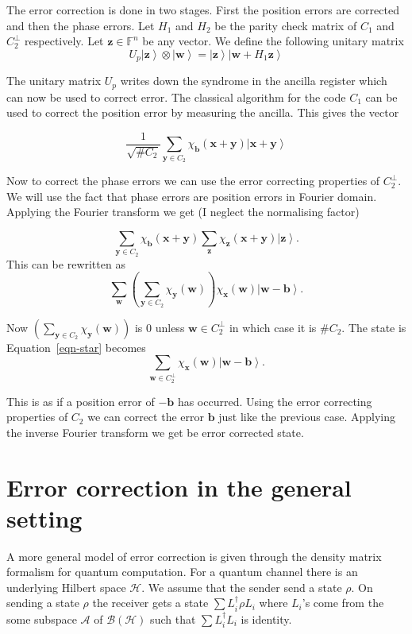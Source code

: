 \documentclass[11pt,twoside]{article}
\theoremstyle{definition}
\theoremstyle{remark}
\newcommand{\ket}[1]{\ensuremath{\left\vert #1 \right\rangle}}
\newcommand{\Oper}[1]{\ensuremath{\mathcal{B}\left(#1\right)}}
\begin{document}
The error correction is done in two stages. First the position errors
are corrected and then the phase errors. Let $H_1$ and $H_2$ be the
parity check matrix of $C_1$ and $C_2^\perp$ respectively. Let
$\mathbf{z} \in \mathbb{F}^n$ be any vector. We define the following
unitary matrix
\[
U_p \ket{\mathbf{z}}\otimes \ket{\mathbf{w}} = \ket{\mathbf{z}}
\ket{\mathbf{w} + H_1 \mathbf{z}}
\]

The unitary matrix $U_p$ writes down the syndrome in the ancilla
register which can now be used to correct error. The classical
algorithm for the code $C_1$ can be used to correct the position error
by measuring the ancilla. This gives the vector

\[
\frac{1}{\sqrt{\# C_2}} \sum_{\mathbf{y} \in C_2}
\chi_{\mathbf{b}}(\mathbf{x}+\mathbf{y}) \ket{\mathbf{x} + \mathbf{y}
}
\]

Now to correct the phase errors we can use the error correcting
properties of $C_2^\perp$. We will use the fact that phase errors are
position errors in Fourier domain. Applying the Fourier transform we
get (I neglect the normalising factor)

\[
\sum_{\mathbf{y}\in C_2} \chi_{\mathbf{b}}(\mathbf{x}+\mathbf{y})
\sum_{\mathbf{z}} \chi_{\mathbf{z}}(\mathbf{x}+\mathbf{y})
\ket{\mathbf{z}}.
\]
This can be rewritten as 
\begin{equation}\label{eqn-star}
\sum_{\mathbf{w}} \left( \sum_{\mathbf{y}\in C_2}
  \chi_{\mathbf{y}}(\mathbf{w}) \right) \chi_{\mathbf{x}}(\mathbf{w})
\ket{\mathbf{w} - \mathbf{b}}.
\end{equation}

Now $\left( \sum_{\mathbf{y}\in C_2} \chi_{\mathbf{y}}(\mathbf{w})
\right)$ is $0$ unless $\mathbf{w} \in C_2^\perp$ in which case it is
$\# C_2$. The state is Equation~\ref{eqn-star} becomes
\[
\sum_{\mathbf{w} \in C_2^\perp} \chi_{\mathbf{x}}(\mathbf{w})
\ket{\mathbf{w} - \mathbf{b}}.
\]

This is as if a position error of $- \mathbf{b}$ has occurred. Using
the error correcting properties of $C_2$ we can correct the error
$\mathbf{b}$ just like the previous case. Applying the inverse Fourier
transform we get be error corrected state.

\section{Error correction in the general setting}

A more general model of error correction is given through the density
matrix formalism for quantum computation.  For a quantum channel there
is an underlying Hilbert space $\mathcal{H}$. We assume that the
sender send a state $\rho$.  On sending a state $\rho$ the receiver
gets a state $\sum L_i^\dag \rho L_i$ where $L_i$'s come from the some
subspace $\mathcal{A}$ of $\Oper{\mathcal{H}}$ such that $\sum
L_i^\dag L_i$ is identity.
\end{document}
